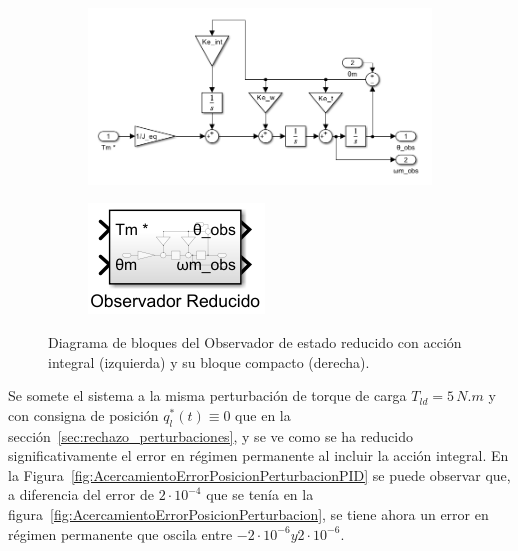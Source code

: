 \documentclass{article}
\begin{document}
\begin{figure}[H]
    \centering
    \begin{subfigure}[t]{0.55\textwidth}
        \centering
        \includegraphics[width=\textwidth]{Imagenes/Observador_PID.png}
    \end{subfigure}
    \hfill %
    \begin{subfigure}[t]{0.2\textwidth}
        \centering
        \includegraphics[width=\textwidth]{Imagenes/observador_compacto.png}
    \end{subfigure}
    \caption{Diagrama de bloques del Observador de estado reducido con acción integral (izquierda) y su bloque compacto (derecha).}
    \label{fig:Observador_PID}
\end{figure}

Se somete el sistema a la misma perturbación de torque de carga \(T_{ld} = 5\,N{.}m\) y con consigna de posición \(q_l^*(t) \equiv 0\) que en la sección~\ref{sec:rechazo_perturbaciones}, y se ve como se ha reducido significativamente el error en régimen permanente al incluir la acción integral. En la Figura~\ref{fig:AcercamientoErrorPosicionPerturbacionPID} se puede observar que, a diferencia del error de \(2\cdot 10^{-4}\) que se tenía en la figura~\ref{fig:AcercamientoErrorPosicionPerturbacion}, se tiene ahora un error en régimen permanente que oscila entre \(-2\cdot 10^{-6} y 2\cdot 10^{-6}\).
\end{document}
